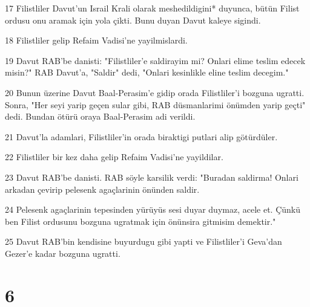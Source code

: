 \par 17 Filistliler Davut'un Israil Krali olarak meshedildigini* duyunca, bütün Filist ordusu onu aramak için yola çikti. Bunu duyan Davut kaleye sigindi.
\par 18 Filistliler gelip Refaim Vadisi'ne yayilmislardi.
\par 19 Davut RAB'be danisti: "Filistliler'e saldirayim mi? Onlari elime teslim edecek misin?" RAB Davut'a, "Saldir" dedi, "Onlari kesinlikle eline teslim decegim."
\par 20 Bunun üzerine Davut Baal-Perasim'e gidip orada Filistliler'i bozguna ugratti. Sonra, "Her seyi yarip geçen sular gibi, RAB düsmanlarimi önümden yarip geçti" dedi. Bundan ötürü oraya Baal-Perasim adi verildi.
\par 21 Davut'la adamlari, Filistliler'in orada biraktigi putlari alip götürdüler.
\par 22 Filistliler bir kez daha gelip Refaim Vadisi'ne yayildilar.
\par 23 Davut RAB'be danisti. RAB söyle karsilik verdi: "Buradan saldirma! Onlari arkadan çevirip pelesenk agaçlarinin önünden saldir.
\par 24 Pelesenk agaçlarinin tepesinden yürüyüs sesi duyar duymaz, acele et. Çünkü ben Filist ordusunu bozguna ugratmak için önünsira gitmisim demektir."
\par 25 Davut RAB'bin kendisine buyurdugu gibi yapti ve Filistliler'i Geva'dan Gezer'e kadar bozguna ugratti.

\chapter{6}

